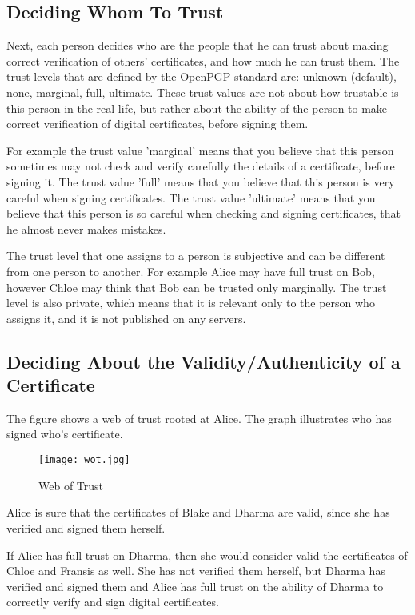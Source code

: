\documentclass[a4paper]{article}
\begin{document}
\subsection{Deciding Whom To Trust}

Next, each person decides who are the people that he can trust about
making correct verification of others' certificates, and how much he
can trust them. The trust levels that are defined by the OpenPGP
standard are: unknown (default), none, marginal, full, ultimate.
These trust values are not about how trustable is this person in the
real life, but rather about the ability of the person to make correct
verification of digital certificates, before signing them.

For example the trust value 'marginal' means that you believe that
this person sometimes may not check and verify carefully the details
of a certificate, before signing it. The trust value 'full' means that
you believe that this person is very careful when signing
certificates. The trust value 'ultimate' means that you believe that
this person is so careful when checking and signing certificates,
that he almost never makes mistakes.

The trust level that one assigns to a person is subjective and can be
different from one person to another. For example Alice may have full
trust on Bob, however Chloe may think that Bob can be trusted only
marginally. The trust level is also private, which means that it is
relevant only to the person who assigns it, and it is not published on
any servers.

\subsection{Deciding About the Validity/Authenticity of a Certificate }

The figure shows a web of trust rooted at Alice. The graph illustrates
who has signed who's certificate.

\begin{figure}[ht]
\begin{center}
\texttt{[image: wot.jpg]}
\caption{Web of Trust }
\label{wot}
\end{center}
\end{figure}

Alice is sure that the certificates of Blake and Dharma are valid,
since she has verified and signed them herself.

If Alice has full trust on Dharma, then she would consider valid the
certificates of Chloe and Fransis as well. She has not verified them
herself, but Dharma has verified and signed them and Alice has full
trust on the ability of Dharma to correctly verify and sign digital
certificates.
\end{document}
